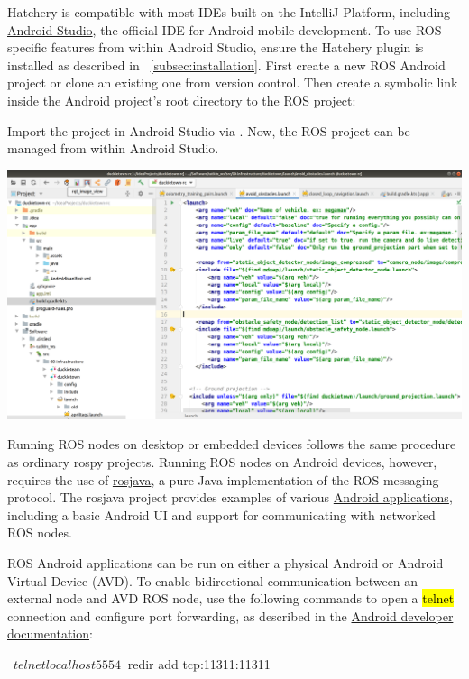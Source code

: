 \documentclass[12pt,initial,twoside,maitrise]{dms}
\newcommand{\inline}[1]{%
    \begingroup%
    \sethlcolor{slightgray}%
    \hl{\ttfamily\small #1}%
    \endgroup
}
\numberwithin{equation}{section}
\numberwithin{table}{chapter}
\numberwithin{figure}{chapter}
\begin{document}
Hatchery is compatible with most IDEs built on the IntelliJ Platform, including \href{https://developer.android.com/studio}{Android Studio}, the official IDE for Android mobile development. To use ROS-specific features from within Android Studio, ensure the Hatchery plugin is installed as described in ~\autoref{subsec:installation}. First create a new ROS Android project or clone an existing one from version control. Then create a symbolic link inside the Android project's root directory to the ROS project:
%
%
Import the project in Android Studio via .  Now, the ROS project can be managed from within Android Studio.\vspace{10pt}\\
%
\begin{centering}
\includegraphics[width=\textwidth]{../figures/hatchery_android.png}
\end{centering}\vspace{10pt}
%
Running ROS nodes on desktop or embedded devices follows the same procedure as ordinary rospy projects. Running ROS nodes on Android devices, however, requires the use of \href{http://wiki.ros.org/rosjava}{rosjava}, a pure Java implementation of the ROS messaging protocol. The rosjava project provides examples of various \href{https://github.com/rosjava/android_apps}{Android applications}, including a basic Android UI and support for communicating with networked ROS nodes.

ROS Android applications can be run on either a physical Android or Android Virtual Device (AVD). To enable bidirectional communication between an external node and AVD ROS node, use the following commands to open a \inline{telnet} connection and configure port forwarding, as described in the \href{https://developer.android.com/studio/run/emulator-networking#consoleredir}{Android developer documentation}:
%
\begin{pclisting}
~$ telnet localhost 5554
~$ redir add tcp:11311:11311
\end{pclisting}
\end{document}
